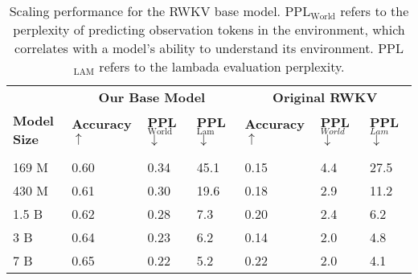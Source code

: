 \begin{table}[htbp]
    \begin{center}
        \begin{tabular}{l|lll|lll}
        \multicolumn{1}{l}{} & \multicolumn{3}{c}{\bf Our Base Model} & \multicolumn{3}{c}{\bf Original RWKV} \\
            \multicolumn{1}{l}{\bf Model Size}  &\multicolumn{1}{l}{\bf Accuracy $\uparrow$} &\multicolumn{1}{l}{\bf PPL$_{\text{World}}$ $\downarrow$}&\multicolumn{1}{l}{\bf PPL$_{\text{Lam}}$ $\downarrow$} &\multicolumn{1}{l}{\bf Accuracy $\uparrow$} &\multicolumn{1}{l}{\bf PPL$_{World}$ $\downarrow$}&\multicolumn{1}{l}{\bf PPL$_{Lam}$ $\downarrow$}\\ 
            \hline \\
            169 M & 0.60 & 0.34 & 45.1 & 0.15 & 4.4 & 27.5 \\
            430 M & 0.61 & 0.30 & 19.6 & 0.18 & 2.9 & 11.2 \\
            1.5 B & 0.62 & 0.28 & 7.3 & 0.20 & 2.4 & 6.2 \\
            3 B   & 0.64 & 0.23 & 6.2 & 0.14 & 2.0 & 4.8 \\
            7 B   & 0.65 & 0.22 & 5.2 & 0.22 & 2.0 & 4.1 \\
        \end{tabular}
    \end{center}
    \caption{Scaling performance for the RWKV base model. PPL$_{\text{World}}$ refers to the perplexity of predicting observation tokens in the environment, which correlates with a model's ability to understand its environment. PPL$_{\text{LAM}}$ refers to the lambada evaluation perplexity.}
    \label{tab:baseModelAblation}
\end{table}





